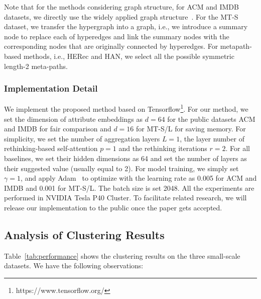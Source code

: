 \documentclass[11pt]{article}
\begin{document}
%
Note that for the methods considering graph structure, for ACM and IMDB datasets, we directly use the widely applied graph structure~\cite{hu_heterogeneous_2020}. For the MT-S dataset, we transfer the hypergraph into a graph, i.e., we introduce a summary node to replace each of hyperedges and link the summary nodes with the corresponding nodes that are originally connected by hyperedges.
For metapath-based methods, i.e., HERec and HAN, we select all the possible symmetric length-2 meta-paths.


\subsubsection{Implementation Detail}
We implement the proposed method based on Tensorflow\footnote{https://www.tensorflow.org/}. For our method, we set the dimension of attribute embeddings as $ d=64 $ for the public datasets ACM and IMDB for fair comparison and $ d=16 $ for MT-S/L for saving memory. For simplicity, we set the number of aggregation layers $L = 1$, the layer number of rethinking-based self-attention $p = 1$ and the rethinking iterations $r=2$. For all baselines, we set their hidden dimensions as 64 and set the number of layers as their suggested value (usually equal to 2). For model training, we simply set $ \gamma = 1 $, and apply Adam~\cite{kingma_adam_2015} to optimize with the learning rate as 0.005 for ACM and IMDB and 0.001 for MT-S/L. The batch size is set 2048. All the experiments are performed in NVIDIA Tesla P40 Cluster. To facilitate related research, we will release our implementation to the public once the paper gets accepted.


\subsection{Analysis of Clustering Results}

Table~\ref{tab:performance} shows the clustering results on the three small-scale datasets. We have the following observations:
\end{document}
